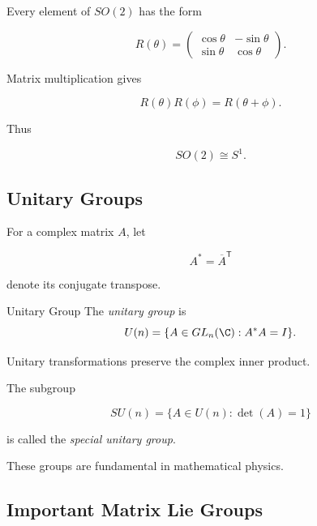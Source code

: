 Every element of \(SO(2)\) has the form

\[ R(\theta)=
\begin{pmatrix}
\cos\theta&-\sin\theta\\
\sin\theta&\cos\theta
\end{pmatrix}. \]

Matrix multiplication gives

\[ R(\theta)R(\phi)=R(\theta+\phi). \]

Thus

\[ SO(2)\cong S^1. \]

\begin{center}
\end{center}

\subsection{Unitary Groups}
\label{subsec:unitary-groups}

For a complex matrix \(A\), let

\[ A^*=\overline{A}^{\mathsf T} \]

denote its conjugate transpose.

\begin{definitionbox}{Unitary Group}
The \emph{unitary group} is
\[ U(n)=\{A\in GL_n(\C):A^*A=I\}. \]
\end{definitionbox}

Unitary transformations preserve the complex inner product.

The subgroup

\[ SU(n)=\{A\in U(n):\det(A)=1\} \]

is called the \emph{special unitary group}.

These groups are fundamental in mathematical physics.

\subsection{Important Matrix Lie Groups}
\label{subsec:important-matrix-lie-groups}

